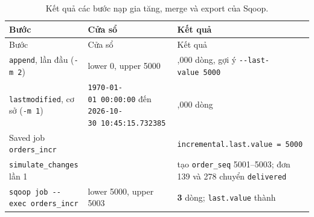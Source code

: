 \documentclass[
  12pt,
  a4paper,
]{report}
\begin{document}
\begin{longtable}[]{@{}
  >{\raggedright\arraybackslash}p{}
  >{\raggedright\arraybackslash}p{}
  >{\raggedright\arraybackslash}p{}@{}}
\caption{\label{tbl:l04-sqoop-incr}Kết quả các bước nạp gia tăng, merge
và export của Sqoop.}\tabularnewline
\toprule\noalign{}
\begin{minipage}[b]{\linewidth}\raggedright
Bước
\end{minipage} & \begin{minipage}[b]{\linewidth}\raggedright
Cửa sổ
\end{minipage} & \begin{minipage}[b]{\linewidth}\raggedright
Kết quả
\end{minipage} \\
\midrule\noalign{}
\endfirsthead
\toprule\noalign{}
\begin{minipage}[b]{\linewidth}\raggedright
Bước
\end{minipage} & \begin{minipage}[b]{\linewidth}\raggedright
Cửa sổ
\end{minipage} & \begin{minipage}[b]{\linewidth}\raggedright
Kết quả
\end{minipage} \\
\midrule\noalign{}
\endhead
\bottomrule\noalign{}
\endlastfoot
\texttt{append}, lần đầu (\texttt{-m\ 2}) & lower 0, upper 5000 & 5,000
dòng, gợi ý \texttt{-\/-last-value\ 5000}\allowbreak{} \\
\texttt{lastmodified}, cơ sở (\texttt{-m\ 1}) &
\texttt{\textquotesingle{}1970-01-01\ 00:}\allowbreak{}\texttt{00:}\allowbreak{}\texttt{00\textquotesingle{}}\allowbreak{}
đến
\texttt{\textquotesingle{}2026-10-30\ 10:}\allowbreak{}\texttt{45:}\allowbreak{}\texttt{15.}\allowbreak{}\texttt{732385\textquotesingle{}}\allowbreak{}
& 5,000 dòng \\
Saved job \texttt{orders\_incr} & &
\texttt{incremental.}\allowbreak{}\texttt{last.}\allowbreak{}\texttt{value\ =}\allowbreak{}\texttt{\ 5000}\allowbreak{} \\
\texttt{simulate\_}\allowbreak{}\texttt{changes}\allowbreak{} lần 1 & &
tạo \texttt{order\_seq} 5001--5003; đơn 139 và 278 chuyển
\texttt{delivered} \\
\texttt{sqoop\ job\ -\/-exec\ orders\_}\allowbreak{}\texttt{incr}\allowbreak{}
& lower 5000, upper 5003 & \textbf{3} dòng; \texttt{last.value} thành

\end{longtable}
\end{document}
